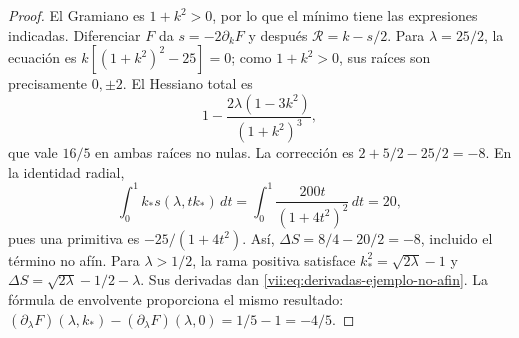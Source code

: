 \begin{proof}
El Gramiano es \(1+k^2>0\), por lo que el mínimo tiene las
expresiones indicadas. Diferenciar \(F\) da
\(s=-2\partial_kF\) y después \(\mathcal R=k-s/2\).
Para \(\lambda=25/2\), la ecuación es
\(k[(1+k^2)^2-25]=0\); como \(1+k^2>0\), sus raíces
son precisamente \(0,\pm2\). El Hessiano total es
\[
 1-\frac{2\lambda(1-3k^2)}{(1+k^2)^3},
\]
que vale \(16/5\) en ambas raíces no nulas. La corrección es
\(2+5/2-25/2=-8\). En la identidad radial,
\[
 \int_0^1 k_*s(\lambda,tk_*)\,dt
    =\int_0^1\frac{200t}{(1+4t^2)^2}\,dt=20,
\]
pues una primitiva es \(-25/(1+4t^2)\).
Así, \(\Delta S=8/4-20/2=-8\), incluido el término no afín.
Para \(\lambda>1/2\), la rama positiva satisface
\(k_*^2=\sqrt{2\lambda}-1\) y
\(\Delta S=\sqrt{2\lambda}-1/2-\lambda\).
Sus derivadas dan \eqref{vii:eq:derivadas-ejemplo-no-afin}.
La fórmula de envolvente proporciona el mismo resultado:
\((\partial_\lambda F)(\lambda,k_*)
 -(\partial_\lambda F)(\lambda,0)=1/5-1=-4/5\).
\end{proof}
